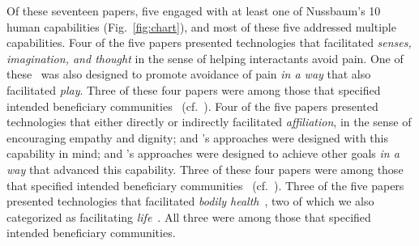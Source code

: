 \documentclass[letterpaper]{article} %
\begin{document}
Of these seventeen papers, five engaged with at least one of Nussbaum's 10 human capabilities (Fig.~\ref{fig:chart}), and most of these five addressed multiple capabilities. 
%
Four of the five papers presented technologies that facilitated \textit{senses, imagination, and thought} in the sense of helping interactants avoid pain. One of these~\cite{foster2020towards} was also designed to promote avoidance of pain \textit{in a way} that also facilitated \textit{play}. Three of these four papers were among those that specified intended beneficiary communities~\cite{reneau2020supporting,foster2020towards,pourebadi2020stroke} (cf.~\citet{jeong2020face}). 
Four of the five papers presented technologies that either directly or indirectly facilitated \textit{affiliation}, in the sense of encouraging empathy and dignity; \citet{pourebadi2020stroke} and \citet{jeong2020face}'s approaches were designed with this capability in mind; \citet{reneau2020supporting} and \citet{wilson2020knowledge}'s approaches were designed to achieve other goals \textit{in a way} that advanced this capability. Three of these four papers were among those that specified intended beneficiary communities~\cite{reneau2020supporting,wilson2020knowledge,pourebadi2020stroke} (cf.~\citet{jeong2020face}).
Three of the five papers presented technologies that facilitated \textit{bodily health}~\cite{reneau2020supporting,wilson2020knowledge,pourebadi2020stroke}, two of which we also categorized as facilitating \textit{life}~\cite{wilson2020knowledge,pourebadi2020stroke}. All three were among those that specified intended beneficiary communities. 
\end{document}
